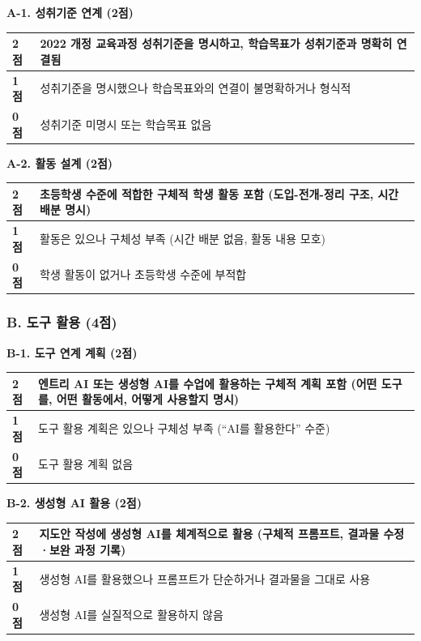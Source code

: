 \documentclass[a4paper,11pt]{ltjsarticle}
\begin{document}
\textbf{A-1. 성취기준 연계 (2점)}

\noindent
\begin{tabularx}{\textwidth}{|>{\centering\arraybackslash}p{1cm}|X|}
\hline
\textbf{2점} & 2022 개정 교육과정 성취기준을 명시하고, 학습목표가 성취기준과 명확히 연결됨 \\ \hline
\textbf{1점} & 성취기준을 명시했으나 학습목표와의 연결이 불명확하거나 형식적 \\ \hline
\textbf{0점} & 성취기준 미명시 또는 학습목표 없음 \\ \hline
\end{tabularx}

\vspace{0.3em}
\textbf{A-2. 활동 설계 (2점)}

\noindent
\begin{tabularx}{\textwidth}{|>{\centering\arraybackslash}p{1cm}|X|}
\hline
\textbf{2점} & 초등학생 수준에 적합한 구체적 학생 활동 포함 (도입-전개-정리 구조, 시간 배분 명시) \\ \hline
\textbf{1점} & 활동은 있으나 구체성 부족 (시간 배분 없음, 활동 내용 모호) \\ \hline
\textbf{0점} & 학생 활동이 없거나 초등학생 수준에 부적합 \\ \hline
\end{tabularx}

\subsubsection{B. 도구 활용 (4점)}

\textbf{B-1. 도구 연계 계획 (2점)}

\noindent
\begin{tabularx}{\textwidth}{|>{\centering\arraybackslash}p{1cm}|X|}
\hline
\textbf{2점} & 엔트리 AI 또는 생성형 AI를 수업에 활용하는 구체적 계획 포함 (어떤 도구를, 어떤 활동에서, 어떻게 사용할지 명시) \\ \hline
\textbf{1점} & 도구 활용 계획은 있으나 구체성 부족 (``AI를 활용한다'' 수준) \\ \hline
\textbf{0점} & 도구 활용 계획 없음 \\ \hline
\end{tabularx}

\vspace{0.3em}
\textbf{B-2. 생성형 AI 활용 (2점)}

\noindent
\begin{tabularx}{\textwidth}{|>{\centering\arraybackslash}p{1cm}|X|}
\hline
\textbf{2점} & 지도안 작성에 생성형 AI를 체계적으로 활용 (구체적 프롬프트, 결과물 수정·보완 과정 기록) \\ \hline
\textbf{1점} & 생성형 AI를 활용했으나 프롬프트가 단순하거나 결과물을 그대로 사용 \\ \hline
\textbf{0점} & 생성형 AI를 실질적으로 활용하지 않음 \\ \hline
\end{tabularx}
\end{document}
